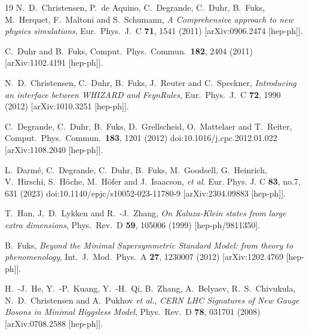\documentclass[12pt]{book}
\begin{document}
\begin{thebibliography}{19}
  N.~D.~Christensen, P.~de Aquino, C.~Degrande, C.~Duhr, B.~Fuks,
  M.~Herquet, F.~Maltoni and S.~Schumann,
  {\em A Comprehensive approach to new physics simulations},
  Eur.\ Phys.\ J.\ C {\bf 71}, 1541 (2011)
  [arXiv:0906.2474 [hep-ph]].

  C.~Duhr and B.~Fuks,
  Comput.\ Phys.\ Commun.\  {\bf 182}, 2404 (2011)
  [arXiv:1102.4191 [hep-ph]].

  N.~D.~Christensen, C.~Duhr, B.~Fuks, J.~Reuter and C.~Speckner,
  {\em Introducing an interface between WHIZARD and FeynRules},
  Eur.\ Phys.\ J.\ C {\bf 72}, 1990 (2012)
  [arXiv:1010.3251 [hep-ph]].

  C.~Degrande, C.~Duhr, B.~Fuks, D.~Grellscheid, O.~Mattelaer and T.~Reiter,
  Comput.\ Phys.\ Commun.\  {\bf 183}, 1201 (2012)
  doi:10.1016/j.cpc.2012.01.022
  [arXiv:1108.2040 [hep-ph]].

L.~Darm{\'e}, C.~Degrande, C.~Duhr, B.~Fuks, M.~Goodsell, G.~Heinrich, V.~Hirschi, S.~H{\"o}che, M.~H{\"o}fer and J.~Isaacson, \textit{et al.}
Eur. Phys. J. C \textbf{83}, no.7, 631 (2023)
doi:10.1140/epjc/s10052-023-11780-9
[arXiv:2304.09883 [hep-ph]].
  
  T.~Han, J.~D.~Lykken and R.~-J.~Zhang,
  {\em On Kaluza-Klein states from large extra dimensions},
  Phys.\ Rev.\ D {\bf 59}, 105006 (1999)
  [hep-ph/9811350].

  B.~Fuks,
  {\em Beyond the Minimal Supersymmetric Standard Model: from theory
    to phenomenology},
  Int.\ J.\ Mod.\ Phys.\ A {\bf 27}, 1230007 (2012)
  [arXiv:1202.4769 [hep-ph]].

  H.~-J.~He, Y.~-P.~Kuang, Y.~-H.~Qi, B.~Zhang, A.~Belyaev,
  R.~S.~Chivukula, N.~D.~Christensen and A.~Pukhov {\it et al.},
  {\em CERN LHC Signatures of New Gauge Bosons in Minimal Higgsless
    Model},
  Phys.\ Rev.\ D {\bf 78}, 031701 (2008)
  [arXiv:0708.2588 [hep-ph]].


\end{thebibliography}
\end{document}
